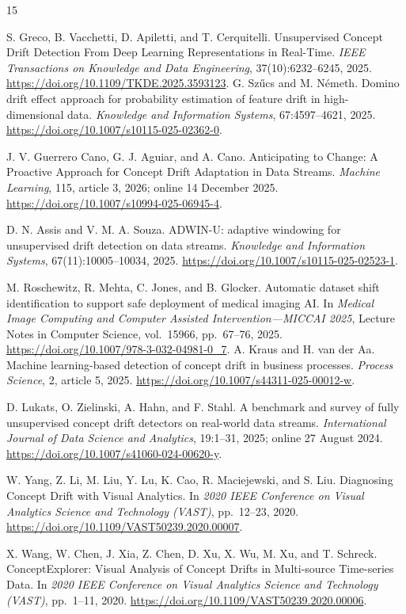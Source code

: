 \documentclass[10pt,a4paper]{article}
\begin{document}
\clearpage
\begin{thebibliography}{15}\small\raggedright
{}
S. Greco, B. Vacchetti, D. Apiletti, and T. Cerquitelli.
Unsupervised Concept Drift Detection From Deep Learning Representations in Real-Time.
\emph{IEEE Transactions on Knowledge and Data Engineering}, 37(10):6232--6245, 2025.
\url{https://doi.org/10.1109/TKDE.2025.3593123}.
G. Sz\H{u}cs and M. N\'emeth.
Domino drift effect approach for probability estimation of feature drift in high-dimensional data.
\emph{Knowledge and Information Systems}, 67:4597--4621, 2025.
\url{https://doi.org/10.1007/s10115-025-02362-0}.

J. V. Guerrero Cano, G. J. Aguiar, and A. Cano.
Anticipating to Change: A Proactive Approach for Concept Drift Adaptation in Data Streams.
\emph{Machine Learning}, 115, article 3, 2026; online 14 December 2025.
\url{https://doi.org/10.1007/s10994-025-06945-4}.

D. N. Assis and V. M. A. Souza.
ADWIN-U: adaptive windowing for unsupervised drift detection on data streams.
\emph{Knowledge and Information Systems}, 67(11):10005--10034, 2025.
\url{https://doi.org/10.1007/s10115-025-02523-1}.

M. Roschewitz, R. Mehta, C. Jones, and B. Glocker.
Automatic dataset shift identification to support safe deployment of medical imaging AI.
In \emph{Medical Image Computing and Computer Assisted Intervention---MICCAI 2025},
Lecture Notes in Computer Science, vol.~15966, pp.~67--76, 2025.
\url{https://doi.org/10.1007/978-3-032-04981-0_7}.
A. Kraus and H. van der Aa.
Machine learning-based detection of concept drift in business processes.
\emph{Process Science}, 2, article 5, 2025.
\url{https://doi.org/10.1007/s44311-025-00012-w}.

D. Lukats, O. Zielinski, A. Hahn, and F. Stahl.
A benchmark and survey of fully unsupervised concept drift detectors on real-world data streams.
\emph{International Journal of Data Science and Analytics}, 19:1--31, 2025; online 27 August 2024.
\url{https://doi.org/10.1007/s41060-024-00620-y}.

W. Yang, Z. Li, M. Liu, Y. Lu, K. Cao, R. Maciejewski, and S. Liu.
Diagnosing Concept Drift with Visual Analytics.
In \emph{2020 IEEE Conference on Visual Analytics Science and Technology (VAST)},
pp.~12--23, 2020.
\url{https://doi.org/10.1109/VAST50239.2020.00007}.

X. Wang, W. Chen, J. Xia, Z. Chen, D. Xu, X. Wu, M. Xu, and T. Schreck.
ConceptExplorer: Visual Analysis of Concept Drifts in Multi-source Time-series Data.
In \emph{2020 IEEE Conference on Visual Analytics Science and Technology (VAST)},
pp.~1--11, 2020.
\url{https://doi.org/10.1109/VAST50239.2020.00006}.


\end{thebibliography}
\end{document}
